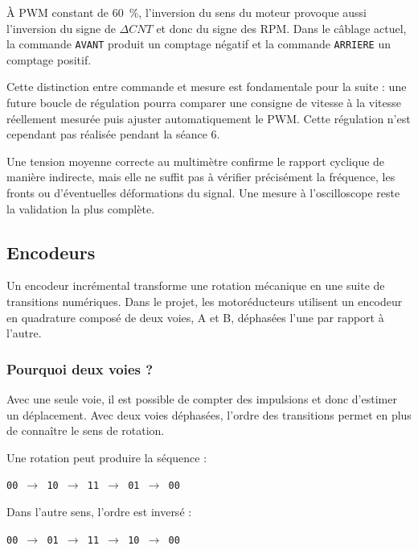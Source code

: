 \documentclass[11pt,a4paper]{article}
\begin{document}
	À PWM constant de 60~\%, l'inversion du sens du moteur provoque aussi l'inversion du signe de $\Delta CNT$ et donc du signe des RPM. Dans le câblage actuel, la commande \texttt{AVANT} produit un comptage négatif et la commande \texttt{ARRIERE} un comptage positif.
	
	Cette distinction entre commande et mesure est fondamentale pour la suite : une future boucle de régulation pourra comparer une consigne de vitesse à la vitesse réellement mesurée puis ajuster automatiquement le PWM. Cette régulation n'est cependant pas réalisée pendant la séance 6.
	
	
	\begin{warningbox}
		Une tension moyenne correcte au multimètre confirme le rapport cyclique de manière indirecte, mais elle ne suffit pas à vérifier précisément la fréquence, les fronts ou d'éventuelles déformations du signal. Une mesure à l'oscilloscope reste la validation la plus complète.
	\end{warningbox}
	\subsection*{Encodeurs}
	
	Un encodeur incrémental transforme une rotation mécanique en une suite de transitions numériques. Dans le projet, les motoréducteurs utilisent un encodeur en quadrature composé de deux voies, A et B, déphasées l'une par rapport à l'autre.
	
	\subsubsection*{Pourquoi deux voies ?}
	
	Avec une seule voie, il est possible de compter des impulsions et donc d'estimer un déplacement. Avec deux voies déphasées, l'ordre des transitions permet en plus de connaître le sens de rotation.
	
	Une rotation peut produire la séquence :
	
	\begin{center}
		\texttt{00 $\rightarrow$ 10 $\rightarrow$ 11 $\rightarrow$ 01 $\rightarrow$ 00}
	\end{center}
	
	Dans l'autre sens, l'ordre est inversé :
	
	\begin{center}
		\texttt{00 $\rightarrow$ 01 $\rightarrow$ 11 $\rightarrow$ 10 $\rightarrow$ 00}
	\end{center}
	
\end{document}
